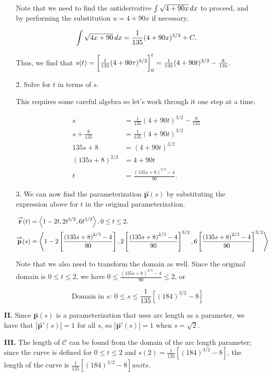 \documentclass[noauthor,handout]{ximera}
\newcommand{\Magd}[2]{\left| \vec{#1}'\left(#2\right) \right|}
\renewcommand{\vec}[1]{{\overset{\boldsymbol{\rightharpoonup}}{\mathbf{#1}}}}
\begin{document}
\begin{problem}
\begin{freeResponse}
\begin{itemize}
Note that we need to find the antiderivative $\int \sqrt{4+90x} \mathop{}\!d x$ to proceed, and by performing the substitution $u=4+90x$ if necessary,

\[
\int \sqrt{4x+90} \mathop{}\!d x = \frac{1}{135} (4+90x)^{3/2} +C.
\] 

Thus, we find that $s(t) = \bigg[ \frac{1}{135} (4+90\tau)^{3/2} \bigg]_0^t = \frac{1}{135} (4+90t)^{3/2}-\frac{8}{135}$.


\item[2.] Solve for $t$ in terms of $s$.

This requires some careful algebra so let's work through it one step at a time.

\begin{align*}
s &= \frac{1}{135} (4+90t)^{3/2}-\frac{8}{135} \\
s +\frac{8}{135} &=  \frac{1}{135} (4+90t)^{3/2} \\
135s +8 &= (4+90t)^{3/2}  \\
\left(135s+8 \right)^{2/3} &= 4+90t \\
t &= \frac{\left(135s+8 \right)^{2/3} -4}{90} .
\end{align*}



\item[3.] We can now find the parameterization $\vec{p}(s)$ by substituting the expression above for $t$ in the original parameterization. 

\begin{align*}
\vec{r}(t) &= \vector{1-2t, 2t^{3/2},6t^{3/2}}, 0 \leq t \leq 2. \\
\vec{p}(s) &= \vector{1-2\left[ \frac{\left(135s+8 \right)^{2/3} -4}{90} \right], 2\left[ \frac{\left(135s+8 \right)^{2/3} -4}{90} \right]^{3/2},6\left[ \frac{\left(135s+8 \right)^{2/3} -4}{90} \right]^{3/2}}\\
\end{align*} 

Note that we also need to transform the domain as well.  Since the original domain is $0 \leq t \leq 2$, we have $0 \leq  \frac{\left(135s+8 \right)^{2/3} -4}{90} \leq 2$, or 

\[
\textrm{ Domain in } s: ~ 0 \leq s \leq\frac{1}{135}\left[(184)^{3/2}-8\right]
\]
\end{itemize}

\textbf{II.} Since $\vec{p}(s)$ is a parameterization that uses arc length as a parameter, we have that $\Magd{p}{s} =1$ for all $s$, so $\Magd{p}{s} =1$ when $s = \sqrt{2}$.

\textbf{III.} The length of $\mathcal{C}$ can be found from the domain of the arc length parameter; since the curve is defined for $0 \leq t \leq 2$ and $s(2) = \frac{1}{135}\left[(184)^{3/2}-8\right]$, the length of the curve is $\frac{1}{135}\left[(184)^{3/2}-8\right] \unit{units}$.

\end{freeResponse}
\end{problem}
\end{document}
